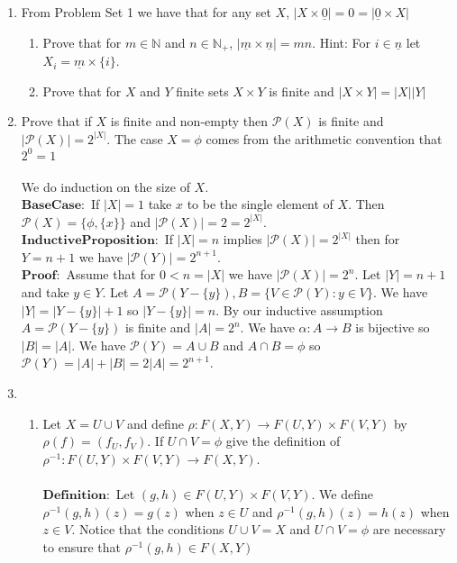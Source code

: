 \documentclass[11pt]{article}
\begin{document}
\begin{enumerate}
\newpage %
\item From Problem Set 1 we have that for any set $X$, $|X \times \underline{0}| = 0 = |\underline{0} \times X|$
\begin{enumerate}
\item Prove that for $m \in \mathbb{N}$ and $n \in \mathbb{N}_+$, $|\underline{m} \times  \underline{n}| = mn$.  Hint:  For $i \in \underline{n}$ let $X_i = \underline{m} \times \{i\}$.
\item Prove that for $X$ and $Y$ finite sets $X \times Y$ is finite and $|X \times Y| = |X||Y|$
\end{enumerate}

\newpage %
\item Prove that if $X$ is finite and non-empty then $\mathcal{P}(X)$ is finite and $|\mathcal{P}(X)| = 2^{|X|}$.  The case $X = \phi$ comes from the arithmetic convention that $2^0 = 1$\\\\
We do induction on the size of $X$.\\
$\mathbf{Base Case:}$ If $|X| = 1$ take $x$ to be the single element of $X$.  Then $\mathcal{P}(X) = \{\phi, \{x\}\}$ and $|\mathcal{P}(X)| = 2 = 2^{|X|}$.\\
$\mathbf{Inductive Proposition:}$  If $|X| = n$ implies $|\mathcal{P}(X)| = 2^{|X|}$ then for $Y = n + 1$ we have $|\mathcal{P}(Y)| = 2^{n+1}$.\\
$\mathbf{Proof:}$ Assume that for $0 < n = |X|$ we have $|\mathcal{P}(X)| = 2^{n}$.  Let $|Y| = n + 1$ and take $y \in Y$.  Let $A = \mathcal{P}(Y - \{y\}), B = \{V \in \mathcal{P}(Y) : y \in V\}$.  We have $|Y| = |Y - \{y\}| +1$ so $|Y - \{y\}| = n$.  By our inductive assumption $A = \mathcal{P}(Y - \{y\})$ is finite and $|A| = 2^n$.  We have $\alpha : A \to B$ is bijective so $|B| = |A|$.  We have $\mathcal{P}(Y) = A \cup B$ and $A \cap B= \phi$ so $\mathcal{P}(Y) = |A| + |B| = 2|A| = 2^{n+1}$.
\newpage %
\item
\begin{enumerate}
\item Let $X = U \cup V$ and define $\rho : F(X,Y) \to F(U,Y) \times F(V,Y)$ by $\rho(f) = (f_U,f_V)$.  If $U \cap V = \phi$ give the definition of $\rho^{-1} : F(U,Y) \times F(V,Y) \to F(X,Y)$.\\\\
$\mathbf{Definition}:$ Let $(g,h) \in F(U,Y) \times F(V,Y)$.  We define $\rho^{-1}(g,h)(z) = g(z)$ when $z \in U$ and $\rho^{-1}(g,h)(z) = h(z)$ when $z \in V$.  Notice that the conditions $U \cup V = X$ and $U \cap V = \phi$ are necessary to ensure that $\rho^{-1}(g,h) \in F(X,Y)$

\end{enumerate}
\end{enumerate}
\end{document}
